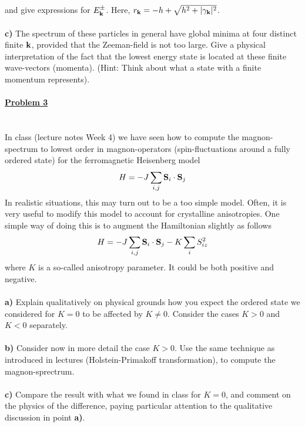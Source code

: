 \documentclass{article}
\begin{document}
and give expressions for $ E^{\pm}_{{\bf k}}$. Here, $r_{{\bf k}} =- h + \sqrt{h^2+|\gamma_{{\bf k}}|^2}$. 
\ \\
\ \\
{\bf c)} The spectrum of these particles in general have global minima at four distinct finite ${\bf k}$, provided that the Zeeman-field is not too large. Give 
a physical interpretation of the fact that the lowest energy state is located at these finite wave-vectors 
(momenta). (Hint: Think about what a state with a finite momentum represents). 
\ \\
\ \\
\underline{\large\bf Problem 3}\\
\ \\
\ \\
In class (lecture notes Week 4) we have seen how to compute the magnon-spectrum to lowest order in magnon-operators (spin-fluctuations around a fully ordered state) for the ferromagnetic Heisenberg model 
\begin{eqnarray}
H = - J \sum_{i,j} {\bf S}_i \cdot {\bf S}_j \nonumber
\end{eqnarray}
In realistic situations, this may turn out to be a too simple model. Often, it is very useful to modify this model to account for crystalline anisotropies. One simple way of doing this is to augment the Hamiltonian slightly as follows 
\begin{eqnarray}
H = - J \sum_{i,j} {\bf S}_i \cdot {\bf S}_j  - K \sum_i S_{iz}^2 \nonumber
\end{eqnarray}
where $K$ is a so-called anisotropy parameter. It could be both positive and negative. 
\ \\
\ \\
{\bf a)} Explain qualitatively on physical grounds how you expect the ordered state we considered for $K=0$ to be affected by $K \neq 0$. Consider the cases $K > 0$ and $K < 0$ separately.
\ \\
\ \\
{\bf b)} Consider now in more detail the case $K > 0$. Use the same technique as introduced in lectures (Holstein-Primakoff transformation), to compute the magnon-sprectrum.
\ \\
\ \\
{\bf c)} Compare the result with what we found in class for $K=0$, and comment on the physics of the difference, paying particular attention to the qualitative discussion in point  {\bf a)}. 
  

\ \\
\ \\
\end{document}
